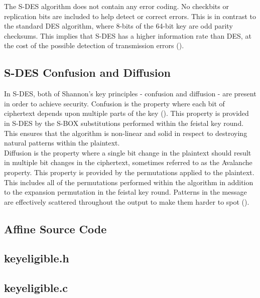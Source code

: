 \documentclass[]{article}
\begin{document}
The S-DES algorithm does not contain any error coding. No checkbits or replication bits are included to help detect or correct errors. This is in contrast to the standard DES algorithm, where 8-bits of the 64-bit key are odd parity checksums. This implies that S-DES has a higher information rate than DES, at the cost of the possible detection of transmission errors (\cite{alttext}).

\subsection*{S-DES Confusion and Diffusion}

In S-DES, both of Shannon's key principles - confusion and diffusion - are present in order to achieve security. Confusion is the property where each bit of ciphertext depends upon multiple parts of the key (\cite{maintext}). This property is provided in S-DES by the S-BOX substitutions performed within the feistal key round. This ensures that the algorithm is non-linear and solid in respect to destroying natural patterns within the plaintext.\\

 Diffusion is the property where a single bit change in the plaintext should result in multiple bit changes in the ciphertext, sometimes referred to as the Avalanche property. This property is provided by the permutations applied to the plaintext. This includes all of the permutations performed within the algorithm in addition to the expansion permutation in the feistal key round. Patterns in the message are effectively scattered throughout the output to make them harder to spot (\cite{alttext}).

\pagebreak


\vspace*{-0.8cm}
\begin{center}
	\section*{Affine Source Code}
\end{center}

\subsection*{keyeligible.h}
\pagebreak{}
\subsection*{keyeligible.c}
\pagebreak{}
\end{document}
